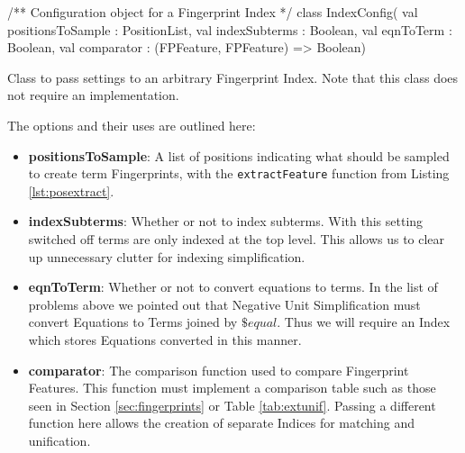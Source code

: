 \begin{listing}[H]
\begin{scalacode}
/** Configuration object for a Fingerprint Index */
class IndexConfig(
  val positionsToSample : PositionList,
  val indexSubterms     : Boolean,
  val eqnToTerm         : Boolean,
  val comparator        : (FPFeature, FPFeature) => Boolean)
\end{scalacode}
\caption{Class to pass settings to an arbitrary Fingerprint Index. Note that
this class does not require an implementation.}
\label{lst:config}
\end{listing}

The options and their uses are outlined here:

\begin{itemize}
\item \textbf{positionsToSample}: A list of positions indicating what should be sampled
to create term Fingerprints, with the \verb!extractFeature! function from Listing \ref{lst:posextract}.
\item \textbf{indexSubterms}: Whether or not to index subterms. With this setting switched
off terms are only indexed at the top level. This allows us to clear up unnecessary clutter
for indexing simplification.
\item \textbf{eqnToTerm}: Whether or not to convert equations to terms. In the list
of problems above we pointed out that Negative Unit Simplification
must convert Equations to Terms joined by $\$equal$. Thus we will require an Index
which stores Equations converted in this manner.
\item \textbf{comparator}: The comparison function used to compare Fingerprint Features.
This function must implement a comparison table such as those seen in Section 
\ref{sec:fingerprints} or Table \ref{tab:extunif}. Passing a different
function here allows the creation of separate Indices for matching and unification.
\end{itemize}

